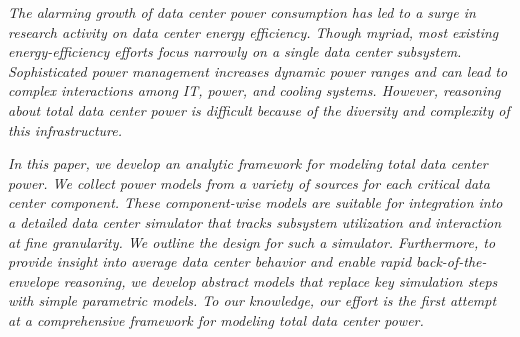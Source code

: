 
\emph{The alarming growth of data center power consumption has led to a surge in research activity on data center energy efficiency.  Though myriad, most existing energy-efficiency efforts focus narrowly on a single data center subsystem. Sophisticated power management increases dynamic power ranges and can lead to complex interactions among IT, power, and cooling systems. However, reasoning about total data center power is difficult because of the diversity and complexity of this infrastructure.}

\emph{In this paper, we develop an analytic framework for modeling total data center power.  We collect power models from a variety of sources for each critical data center component.  These component-wise models are suitable for integration into a detailed data center simulator that tracks subsystem utilization and interaction at fine granularity.  We outline the design for such a simulator.  Furthermore, to provide insight into average data center behavior and enable rapid back-of-the-envelope reasoning, we develop abstract models that replace key simulation steps with simple parametric models. To our knowledge, our effort is the first attempt at a comprehensive framework for modeling total data center power.}
